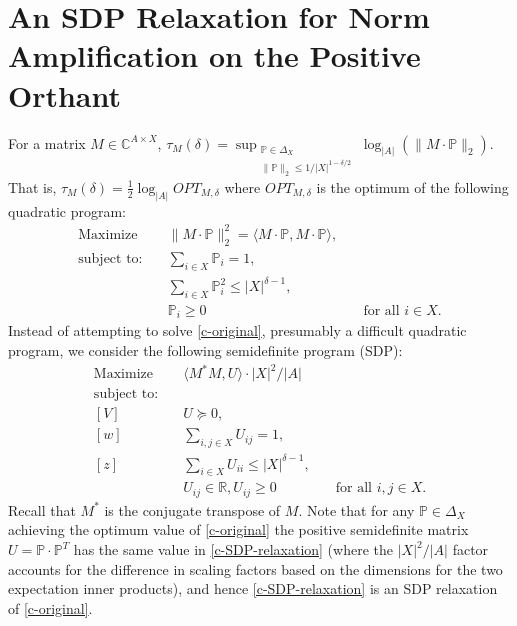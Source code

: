 \newcommand{\realm}{N}
\section{An SDP Relaxation for Norm Amplification on the Positive Orthant}
\label{c-sec:sdp}

For a matrix $M\in \mathbb{C}^{A\times X}$, 
$\displaystyle\tau_M(\delta)=\sup_{\substack{\mathbb{P}\in \Delta_X\\ \|\mathbb{P}\|_2\le 1/|X|^{1-\delta/2}}} \log_{|A|} (\|M\cdot \mathbb{P}\|_2)$.\\[+1ex]
That is, $\tau_M(\delta)=\frac12 \log_{|A|} OPT_{M,\delta}$ where $OPT_{M,\delta}$ is the
optimum of the following quadratic program:
\begin{equation}
\begin{aligned}\label{c-original}
\text{Maximize}  &\quad \|M\cdot \mathbb{P}\|_2^2=\langle M\cdot \mathbb{P},M\cdot \mathbb{P}\rangle,& \\
\text{subject to:}&\quad \sum_{i\in X} \mathbb{P}_i=1,&\\
&\quad \sum_{i\in X} \mathbb{P}_i^2\le |X|^{\delta-1},&\\
&\quad \mathbb{P}_i\geq 0 &\quad \text{for all }i\in X.
\end{aligned}
\end{equation}
Instead of attempting to solve \eqref{c-original}, presumably a difficult
quadratic program, we consider the following semidefinite program (SDP):
\begin{equation} \label{c-SDP-relaxation}
\begin{aligned}
\text{Maximize}&\quad \langle M^{*} M,U\rangle\cdot |X|^2/|A| &\\
\text{subject to:} &&\\
[V]&\quad U\succeq 0,&\\
[w]&\quad \sum_{i,j\in X} U_{ij}=1,  &\\
[z]&\quad \sum_{i\in X} U_{ii}\le |X|^{\delta-1},&\\
&\quad U_{ij}\in \mathbb{R},U_{ij}\geq 0 &\quad\text{for all } i,j\in X.
\end{aligned}
\end{equation}
Recall that $M^{*}$ is the conjugate transpose of $M$.
Note that for any $\mathbb{P}\in \Delta_X$ achieving the optimum value
of \eqref{c-original} the positive semidefinite matrix
$U=\mathbb{P}\cdot \mathbb{P}^T$ 
has the same value in \eqref{c-SDP-relaxation} (where the $|X|^2/|A|$ factor
accounts for the difference in scaling factors based on the dimensions for the
two expectation inner products), and hence \eqref{c-SDP-relaxation}
is an SDP relaxation of \eqref{c-original}.

